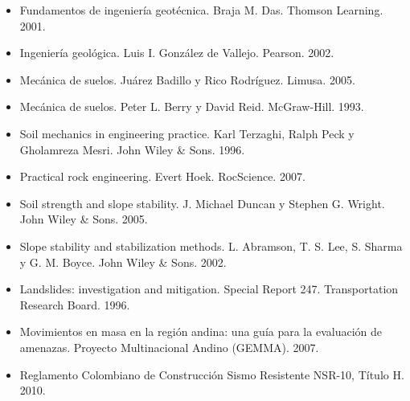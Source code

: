 \documentclass[a4paper,twoside,11pt]{article}
\begin{document}
\begin{itemize}
\item Fundamentos de ingeniería geotécnica. Braja M. Das. Thomson Learning. 2001.
\item Ingeniería geológica. Luis I. González de Vallejo. Pearson. 2002.
\item Mecánica de suelos. Juárez Badillo y Rico Rodríguez. Limusa. 2005.
\item Mecánica de suelos. Peter L. Berry y David Reid. McGraw-Hill. 1993.
\item Soil mechanics in engineering practice. Karl Terzaghi, Ralph Peck y Gholamreza Mesri. John Wiley \& Sons. 1996.
\item Practical rock engineering. Evert Hoek. RocScience. 2007.
\item Soil strength and slope stability. J. Michael Duncan y Stephen G. Wright. John Wiley \& Sons. 2005.
\item Slope stability and stabilization methods. L. Abramson, T. S. Lee, S. Sharma y G. M. Boyce. John Wiley \& Sons. 2002.
\item Landslides: investigation and mitigation. Special Report 247. Transportation Research Board. 1996.
\item Movimientos en masa en la región andina: una guía para la evaluación de amenazas. Proyecto Multinacional Andino (GEMMA). 2007.
\item Reglamento Colombiano de Construcción Sismo Resistente NSR-10, Título H. 2010.
\end{itemize}
\end{document}
